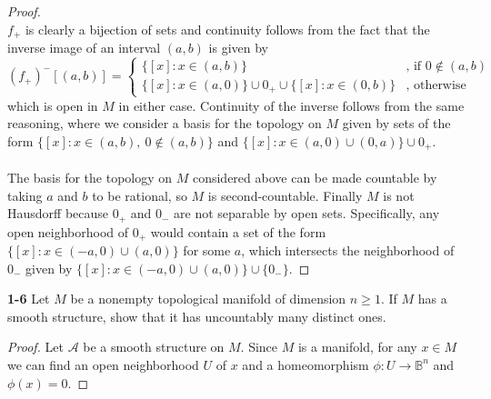 \documentclass[11pt,letterpaper]{report}
\newcommand{\mcal}[1]{\mathcal{#1}}
\newcommand{\ball}{\mathbb{B}}
\begin{document}
\begin{proof}
\[	\]
	$f_+$ is clearly a bijection of sets and continuity follows from the fact that the inverse image of an interval $(a,b)$ is given by
	\[
		(f_+)^-[(a,b)] = \begin{cases}
			\{[x]: x\in (a,b)\}&\text{, if }0\notin (a,b)\\
			\{[x]: x\in (a, 0)\}\cup 0_+\cup \{[x]: x\in (0,b)\}&\text{, otherwise}
		\end{cases}
	\]
	which is open in $M$ in either case. Continuity of the inverse follows from the same reasoning, where we consider a basis for the topology on $M$ given by sets of the form $\{[x]: x\in (a,b),\ 0\notin (a,b)\}$ and $\{[x]: x\in (a, 0)\cup (0,a)\}\cup 0_+$.\\\\
	The basis for the topology on $M$ considered above can be made countable by taking $a$ and $b$ to be rational, so $M$ is second-countable. Finally $M$ is not Hausdorff because $0_+$ and $0_-$ are not separable by open sets. Specifically, any open neighborhood of $0_+$ would contain a set of the form $\{[x]: x\in (-a, 0)\cup (a, 0)\}$ for some $a$, which intersects the neighborhood of $0_-$ given by $\{[x]: x\in (-a, 0)\cup (a, 0)\}\cup \{0_-\}$.
\end{proof}

\noindent\textbf{1-6}
Let $M$ be a nonempty topological manifold of dimension $n\geq 1$. If $M$ has a smooth structure, show that it has uncountably many distinct ones.
\begin{proof}
	Let $\mcal{A}$ be a smooth structure on $M$. Since $M$ is a manifold, for any $x\in M$ we can find an open neighborhood $U$ of $x$ and a homeomorphism $\phi: U\to \ball^n$ and $\phi(x) = 0$.
\end{proof}
\end{document}
